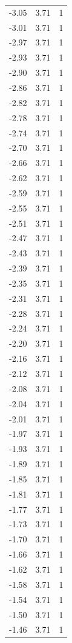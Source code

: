 \begin{longtable}{lrr}
  -3.05 & 3.71 & 1 \\
  -3.01 & 3.71 & 1 \\
  -2.97 & 3.71 & 1 \\
  -2.93 & 3.71 & 1 \\
  -2.90 & 3.71 & 1 \\
  -2.86 & 3.71 & 1 \\
  -2.82 & 3.71 & 1 \\
  -2.78 & 3.71 & 1 \\
  -2.74 & 3.71 & 1 \\
  -2.70 & 3.71 & 1 \\
  -2.66 & 3.71 & 1 \\
  -2.62 & 3.71 & 1 \\
  -2.59 & 3.71 & 1 \\
  -2.55 & 3.71 & 1 \\
  -2.51 & 3.71 & 1 \\
  -2.47 & 3.71 & 1 \\
  -2.43 & 3.71 & 1 \\
  -2.39 & 3.71 & 1 \\
  -2.35 & 3.71 & 1 \\
  -2.31 & 3.71 & 1 \\
  -2.28 & 3.71 & 1 \\
  -2.24 & 3.71 & 1 \\
  -2.20 & 3.71 & 1 \\
  -2.16 & 3.71 & 1 \\
  -2.12 & 3.71 & 1 \\
  -2.08 & 3.71 & 1 \\
  -2.04 & 3.71 & 1 \\
  -2.01 & 3.71 & 1 \\
  -1.97 & 3.71 & 1 \\
  -1.93 & 3.71 & 1 \\
  -1.89 & 3.71 & 1 \\
  -1.85 & 3.71 & 1 \\
  -1.81 & 3.71 & 1 \\
  -1.77 & 3.71 & 1 \\
  -1.73 & 3.71 & 1 \\
  -1.70 & 3.71 & 1 \\
  -1.66 & 3.71 & 1 \\
  -1.62 & 3.71 & 1 \\
  -1.58 & 3.71 & 1 \\
  -1.54 & 3.71 & 1 \\
  -1.50 & 3.71 & 1 \\
  -1.46 & 3.71 & 1 \\

\end{longtable}
